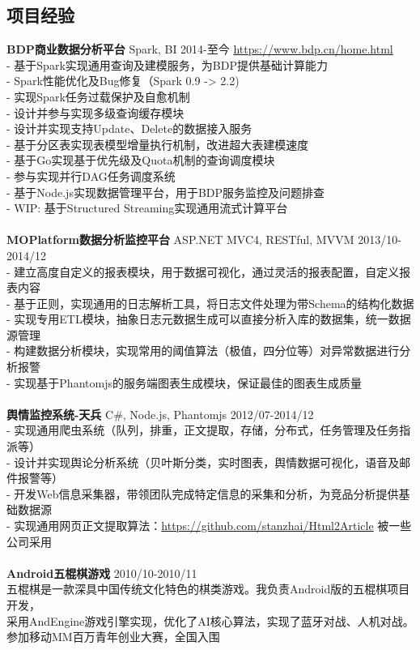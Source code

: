 \documentclass[UTF8,margin,line]{res}
\begin{document}
\begin{resume}
\section{\sc 项目经验}
\textbf{BDP商业数据分析平台} Spark, BI 2014-至今 \url{https://www.bdp.cn/home.html} \\
- 基于Spark实现通用查询及建模服务，为BDP提供基础计算能力 \\
- Spark性能优化及Bug修复（Spark 0.9 -> 2.2) \\
- 实现Spark任务过载保护及自愈机制 \\
- 设计并参与实现多级查询缓存模块 \\
- 设计并实现支持Update、Delete的数据接入服务 \\
- 基于分区表实现表模型增量执行机制，改进超大表建模速度 \\
- 基于Go实现基于优先级及Quota机制的查询调度模块 \\
- 参与实现并行DAG任务调度系统 \\
- 基于Node.js实现数据管理平台，用于BDP服务监控及问题排查 \\
- WIP: 基于Structured Streaming实现通用流式计算平台 \\
\\
\textbf{MOPlatform数据分析监控平台} ASP.NET MVC4, RESTful, MVVM 2013/10-2014/12 \\
- 建立高度自定义的报表模块，用于数据可视化，通过灵活的报表配置，自定义报表内容 \\
- 基于正则，实现通用的日志解析工具，将日志文件处理为带Schema的结构化数据 \\
- 实现专用ETL模块，抽象日志元数据生成可以直接分析入库的数据集，统一数据源管理 \\
- 构建数据分析模块，实现常用的阈值算法（极值，四分位等）对异常数据进行分析报警 \\
- 实现基于Phantomjs的服务端图表生成模块，保证最佳的图表生成质量 \\
\\
\textbf{舆情监控系统-天兵} C\#, Node.js, Phantomjs 2012/07-2014/12 \\
- 实现通用爬虫系统（队列，排重，正文提取，存储，分布式，任务管理及任务指派等） \\
- 设计并实现舆论分析系统（贝叶斯分类，实时图表，舆情数据可视化，语音及邮件报警等） \\
- 开发Web信息采集器，带领团队完成特定信息的采集和分析，为竞品分析提供基础数据源 \\
- 实现通用网页正文提取算法：\url{https://github.com/stanzhai/Html2Article} 被一些公司采用 \\
\\
\textbf{Android五棍棋游戏}  2010/10-2010/11 \\
五棍棋是一款深具中国传统文化特色的棋类游戏。我负责Android版的五棍棋项目开发，\\
采用AndEngine游戏引擎实现，优化了AI核心算法，实现了蓝牙对战、人机对战。\\
参加移动MM百万青年创业大赛，全国入围


\end{resume}
\end{document}
